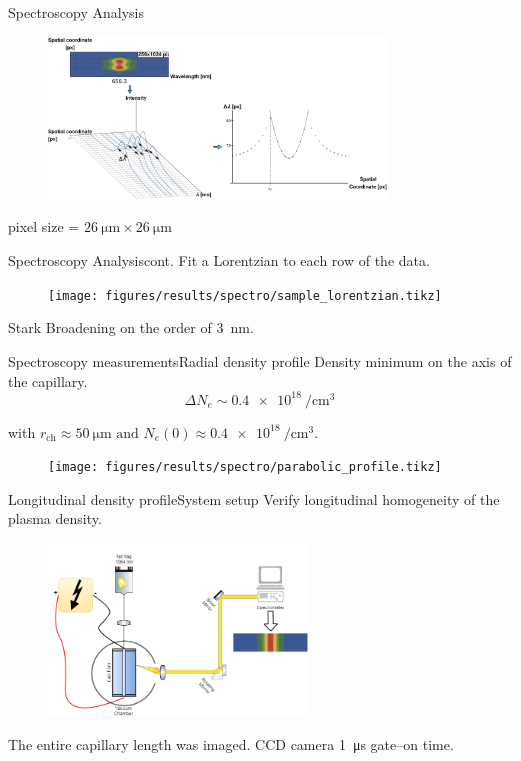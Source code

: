 \documentclass[dvipsnames]{beamer}
\begin{document}
\begin{frame}{Spectroscopy Analysis}
\begin{figure}
   \includegraphics[width=0.8\textwidth]{figures/results/spectro/spectra_analysis.png}
 \end{figure}
 pixel size = $\SI{26}{\um} \times \SI{26}{\um}$
\end{frame}
\begin{frame}{Spectroscopy Analysis}{cont.}
   Fit a Lorentzian to each row of the data.
   \begin{figure}
     \texttt{[image: figures/results/spectro/sample\_lorentzian.tikz]}
   \end{figure}
   Stark Broadening on the order of \SI{3}{\nm}.
\end{frame}
\begin{frame}{Spectroscopy measurements}{Radial density profile}
 {\small Density minimum on the axis of the capillary.}
 \begin{equation*}
   \Delta N_e \sim \SI{0.4e18}{\per \cubic \cm}
 \end{equation*}
\begin{center}
    with $r_\text{ch}\approx \SI{50}{\um} \text{ and } N_e\left(0\right)\approx \SI{0.4e18}{\per\cubic\cm}.$
\end{center}
\begin{figure}
   \texttt{[image: figures/results/spectro/parabolic\_profile.tikz]}
\end{figure}
\end{frame}
\begin{frame}{Longitudinal density profile}{System setup}
 {\small Verify longitudinal homogeneity of the plasma density.}
 \begin{figure}
   \includegraphics[height=130pt]{figures/results/spectro/longitudinal_system.png}
 \end{figure}
 The entire capillary length was imaged.
 CCD camera \SI{1}{\us} gate--on time.
\end{frame}
\end{document}
